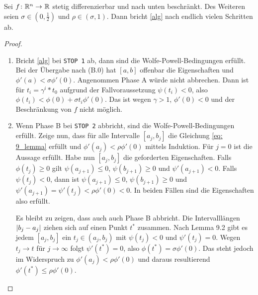 \begin{satz}
	Sei $\abb{f}{\Rn}{\R}$ stetig differenzierbar und nach unten beschränkt. Des Weiteren seien $\sigma \in (0,\frac{1}{2})$ und $\rho \in (\sigma , 1)$. Dann bricht \cref{alg} nach endlich vielen Schritten ab.
\end{satz}
\begin{proof}
	\begin{enumerate}[label=Phase~\Alph*:, nolistsep, leftmargin=*]
		\item Bricht \cref{alg} bei \texttt{STOP 1} ab, dann sind die Wolfe-Powell-Bedingungen erfüllt. Bei der Übergabe nach (B.0) hat $[a,b]$ offenbar die Eigenschaften  und $\phi'(a) < \sigma \phi'(0)$. Angenommen Phase A würde nicht abbrechen. Dann ist für $t_i = \gamma^i * t_0$ aufgrund der Fallvoraussetzung $\psi(t_i) < 0$, also $\phi(t_i) < \phi(0) + \sigma t_i \phi'(0)$. Das ist wegen $\gamma > 1$, $\phi'(0) < 0$ und der Beschränkung von $f$ nicht möglich.
		\item Wenn Phase B bei \texttt{STOP 2} abbricht, sind die Wolfe-Powell-Bedingungen erfüllt. Zeige nun, dass für alle Intervalle $[a_j, b_j]$ die Gleichung \eqref{eq: 9_lemma} erfüllt und $\phi'(a_j) < \rho \phi'(0)$ mittels Induktion. Für $j = 0$ ist die Aussage erfüllt. Habe nun $[a_j, b_j]$ die geforderten Eigenschaften. Falls $\phi(t_j) \ge 0$ gilt $\psi(a_{j+1}) \le 0$, $\psi(b_{j+1}) \ge 0$ und $\psi'(a_{j+1}) < 0$. Falls $\psi(t_j) < 0$, dann ist $\psi(a_{j+1}) \le 0$, $\psi(b_{j+1}) \ge 0$ und $\psi'(a_{j+1}) = \psi'(t_j) < \rho \phi'(0) < 0$. In beiden Fällen sind die Eigenschaften also erfüllt. 
		
		Es bleibt zu zeigen, dass auch auch Phase B abbricht. Die Intervalllängen $\left| b_j - a_j \right|$ ziehen sich auf einen Punkt $t^\ast$ zusammen. Nach Lemma 9.2 gibt es jedem $[a_j,b_j]$ ein $t_j \in (a_j,b_j)$ mit $\psi(t_j) < 0$ und $\psi'(t_j) = 0$. Wegen $t_j \to t$ für $j \to \infty$ folgt $\psi'(t^\ast) = 0$, also $\phi(t^\ast) = \sigma \phi'(0)$. Das steht jedoch im Widerspruch zu $\phi'(a_j) < \rho \phi'(0)$ und daraus resultierend $\phi'(t^\ast) \le \rho \phi'(0)$.  
	\end{enumerate}
\end{proof}